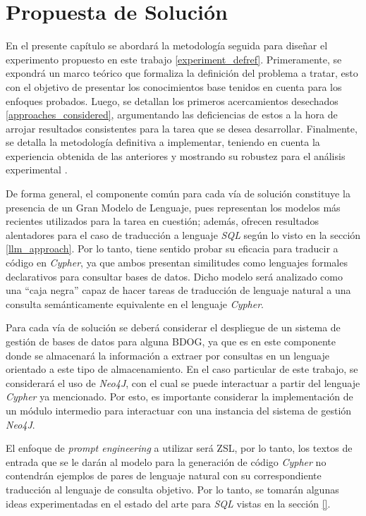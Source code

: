 \chapter{Propuesta de Solución}\label{chapter: proposedsolution}

En el presente capítulo se abordará la metodología seguida para diseñar el experimento propuesto en este trabajo \ref{experiment_defref}. Primeramente, se expondrá un marco teórico que formaliza la definición del problema a tratar, esto con el objetivo de presentar los conocimientos base tenidos en cuenta para los enfoques probados. Luego, se detallan los primeros acercamientos desechados \ref{approaches_considered}, argumentando las deficiencias de estos a la hora de arrojar resultados consistentes para la tarea que se desea desarrollar. Finalmente, se detalla la metodología definitiva a implementar, teniendo en cuenta la experiencia obtenida de las anteriores y mostrando su robustez para el análisis experimental \cite{}.

De forma general, el componente común para cada vía de solución constituye la presencia de un Gran Modelo de Lenguaje, pues representan los modelos más recientes utilizados para la tarea en cuestión; además, ofrecen resultados alentadores para el caso de traducción a lenguaje \textit{SQL} según lo visto en la sección \ref{llm_approach}. Por lo tanto, tiene sentido probar su eficacia para traducir a código en \textit{Cypher}, ya que ambos presentan similitudes como lenguajes formales declarativos para consultar bases de datos. Dicho modelo será analizado como una ``caja negra'' capaz de hacer tareas de traducción de lenguaje natural a una consulta semánticamente equivalente en el lenguaje \textit{Cypher}.

Para cada vía de solución se deberá considerar el despliegue de un sistema de gestión de bases de datos para alguna BDOG, ya que es en este componente donde se almacenará la información a extraer por consultas en un lenguaje orientado a este tipo de almacenamiento. En el caso particular de este trabajo, se considerará el uso de \textit{Neo4J}, con el cual se puede interactuar a partir del lenguaje \textit{Cypher} ya mencionado. Por esto, es importante considerar la implementación de un módulo intermedio para interactuar con una instancia del sistema de gestión \textit{Neo4J}.

El enfoque de \textit{prompt engineering} a utilizar será ZSL, por lo tanto, los textos de entrada que se le darán al modelo para la generación de código \textit{Cypher} no contendrán ejemplos de pares de lenguaje natural con su correspondiente traducción al lenguaje de consulta objetivo. Por lo tanto, se tomarán algunas ideas experimentadas en el estado del arte para \textit{SQL} vistas en la sección \ref{}.

